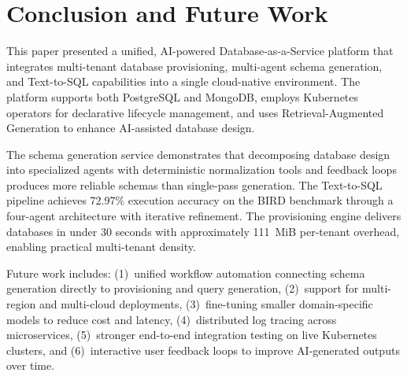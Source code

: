 \documentclass[twoside,twocolumn,10pt]{article}
\begin{document}
\section{Conclusion and Future Work}
\fontsize{11}{13}\selectfont

This paper presented a unified, AI-powered Database-as-a-Service platform that integrates multi-tenant database provisioning, multi-agent schema generation, and Text-to-SQL capabilities into a single cloud-native environment. The platform supports both PostgreSQL and MongoDB, employs Kubernetes operators for declarative lifecycle management, and uses Retrieval-Augmented Generation to enhance AI-assisted database design.

The schema generation service demonstrates that decomposing database design into specialized agents with deterministic normalization tools and feedback loops produces more reliable schemas than single-pass generation. The Text-to-SQL pipeline achieves 72.97\% execution accuracy on the BIRD benchmark through a four-agent architecture with iterative refinement. The provisioning engine delivers databases in under 30 seconds with approximately 111~MiB per-tenant overhead, enabling practical multi-tenant density.

Future work includes: (1)~unified workflow automation connecting schema generation directly to provisioning and query generation, (2)~support for multi-region and multi-cloud deployments, (3)~fine-tuning smaller domain-specific models to reduce cost and latency, (4)~distributed log tracing across microservices, (5)~stronger end-to-end integration testing on live Kubernetes clusters, and (6)~interactive user feedback loops to improve AI-generated outputs over time.


\vspace{0.5cm}

\small

\balance
\fontsize{11}{13}\selectfont
\printbibliography
\end{document}
